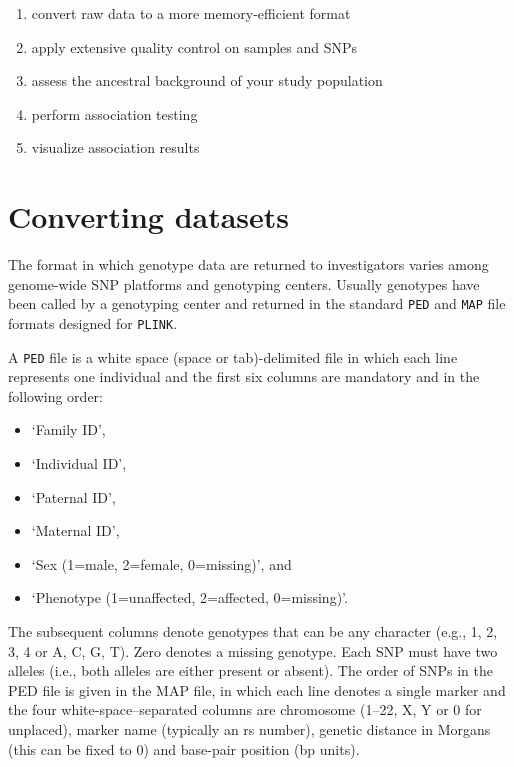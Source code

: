 \documentclass[
]{book}
\newcommand{\passthrough}[1]{#1}
\providecommand{\tightlist}{%
  \setlength{\itemsep}{0pt}\setlength{\parskip}{0pt}}
\begin{document}
\begin{enumerate}
\def\labelenumi{\arabic{enumi}.}
\tightlist
\item
  convert raw data to a more memory-efficient format
\item
  apply extensive quality control on samples and SNPs
\item
  assess the ancestral background of your study population
\item
  perform association testing
\item
  visualize association results
\end{enumerate}

\hypertarget{converting-datasets}{%
\section{Converting datasets}\label{converting-datasets}}

The format in which genotype data are returned to investigators varies among genome-wide SNP platforms and genotyping centers. Usually genotypes have been called by a genotyping center and returned in the standard \passthrough{\lstinline!PED!} and \passthrough{\lstinline!MAP!} file formats designed for \passthrough{\lstinline!PLINK!}.

A \passthrough{\lstinline!PED!} file is a white space (space or tab)-delimited file in which each line represents one individual and the first six columns are mandatory and in the following order:

\begin{itemize}
\tightlist
\item
  `Family ID',
\item
  `Individual ID',
\item
  `Paternal ID',
\item
  `Maternal ID',
\item
  `Sex (1=male, 2=female, 0=missing)', and
\item
  `Phenotype (1=unaffected, 2=affected, 0=missing)'.
\end{itemize}

The subsequent columns denote genotypes that can be any character (e.g., 1, 2, 3, 4 or A, C, G, T). Zero denotes a missing genotype. Each SNP must have two alleles (i.e., both alleles are either present or absent).
The order of SNPs in the PED file is given in the MAP file, in which each line denotes a single marker and the four white-space--separated columns are chromosome (1--22, X, Y or 0 for unplaced), marker name (typically an rs number), genetic distance in Morgans (this can be fixed to 0) and base-pair position (bp units).
\end{document}
